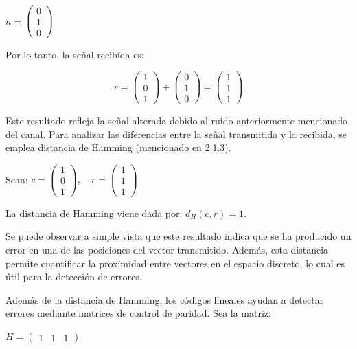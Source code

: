 \documentclass[letterpaper,12pt]{article}
\begin{document}
\centerline{$n = \begin{pmatrix}0 \\ 1 \\ 0\end{pmatrix}$}



Por lo tanto, la señal recibida es:

\[
r = \begin{pmatrix}1 \\ 0 \\ 1\end{pmatrix}
+ \begin{pmatrix}0 \\ 1 \\ 0\end{pmatrix}
= \begin{pmatrix}1 \\ 1 \\ 1\end{pmatrix}
\]

Este resultado refleja la señal alterada debido al ruido anteriormente mencionado del canal.
\newpage
{}
Para analizar las diferencias entre la señal transmitida y la recibida, se emplea distancia de
Hamming (mencionado en 2.1.3).

Sean:
$c = \begin{pmatrix}1 \\ 0 \\ 1\end{pmatrix},\quad r = \begin{pmatrix}1 \\ 1 \\ 1\end{pmatrix}$

La distancia de Hamming viene dada por: $d_H(c,r)=1$.

Se puede observar a simple vista que este resultado indica que se ha producido un error en
una de las posiciones del vector transmitido. Además, esta distancia permite cuantificar la
proximidad entre vectores en el espacio discreto, lo cual es útil para la detección de errores.

Además de la distancia de Hamming, los códigos lineales ayudan a detectar errores
mediante matrices de control de paridad. Sea la matriz:

\centerline{$H=\begin{pmatrix}1&1&1\end{pmatrix}$}
\end{document}
